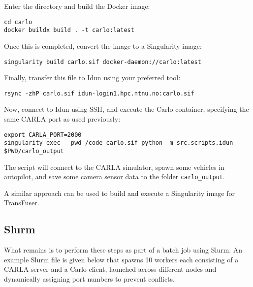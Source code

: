 Enter the directory and build the Docker image:
\begin{lstlisting}
cd carlo
docker buildx build . -t carlo:latest
\end{lstlisting}

Once this is completed,
convert the image to a Singularity image:
\begin{lstlisting}
singularity build carlo.sif docker-daemon://carlo:latest
\end{lstlisting}

Finally, transfer this file to Idun using your preferred tool:
\begin{lstlisting}
rsync -zhP carlo.sif idun-login1.hpc.ntnu.no:carlo.sif
\end{lstlisting}

Now, connect to Idun using SSH,
and execute the Carlo container,
specifying the same CARLA port as used previously:
\begin{lstlisting}
export CARLA_PORT=2000
singularity exec --pwd /code carlo.sif python -m src.scripts.idun $PWD/carlo_output
\end{lstlisting}

The script will connect to the CARLA simulator,
spawn some vehicles in autopilot,
and save some camera sensor data to the folder \texttt{carlo\_output}.

A similar approach can be used to build and execute
a Singularity image for TransFuser.


\subsection{Slurm}

What remains is to perform these steps as part of a batch job using Slurm.
An example Slurm file is given below
that spawns 10 workers
each consisting of a CARLA server and a Carlo client,
launched across different nodes and dynamically assigning
port numbers to prevent conflicts.

